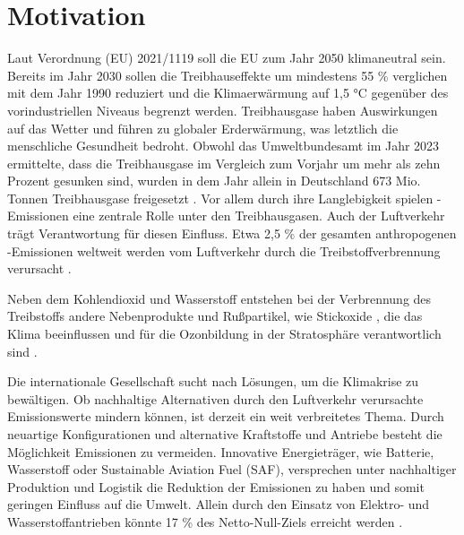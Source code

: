 \chapter{Motivation}
\label{ch:Einleitung}

Laut Verordnung (EU) 2021/1119 soll die EU zum Jahr 2050 klimaneutral sein. Bereits im Jahr 2030 sollen 
die Treibhauseffekte um mindestens 55 \%
verglichen mit dem Jahr 1990 reduziert und die Klimaerwärmung auf 1,5 °C gegenüber 
des vorindustriellen Niveaus begrenzt werden.
Treibhausgase haben Auswirkungen auf das Wetter und führen zu globaler Erderwärmung, 
was letztlich die menschliche Gesundheit bedroht. %
Obwohl das Umweltbundesamt im Jahr 2023 ermittelte, dass die Treibhausgase im Vergleich zum Vorjahr um mehr als zehn Prozent gesunken sind, 
wurden in dem Jahr allein in Deutschland 673 Mio. Tonnen Treibhausgase freigesetzt \cite{bundesregierung}.
Vor allem durch ihre Langlebigkeit \cite{filonchyk2024greenhouse} spielen -Emissionen eine zentrale Rolle unter den Treibhausgasen. 
Auch der Luftverkehr trägt Verantwortung für diesen Einfluss. 
Etwa 2,5 \% der gesamten anthropogenen -Emissionen weltweit werden vom Luftverkehr
durch die Treibstoffverbrennung verursacht \cite{conrady2019luftverkehr}. 

Neben dem Kohlendioxid  und Wasserstoff  entstehen bei der Verbrennung des Treibstoffs andere Nebenprodukte und Rußpartikel, wie Stickoxide ,
die das Klima beeinflussen und für die Ozonbildung in der Stratosphäre verantwortlich sind \cite{conrady2019luftverkehr}.

Die internationale Gesellschaft sucht nach Lösungen, um die Klimakrise zu bewältigen. 
Ob nachhaltige Alternativen durch den Luftverkehr verursachte Emissionswerte mindern können, 
ist derzeit ein weit verbreitetes Thema.
Durch neuartige Konfigurationen und alternative Kraftstoffe und Antriebe besteht die Möglichkeit Emissionen zu vermeiden.
Innovative Energieträger, wie Batterie, Wasserstoff oder Sustainable Aviation Fuel (SAF), 
versprechen unter nachhaltiger Produktion und
Logistik die Reduktion der Emissionen zu haben und somit geringen Einfluss auf die Umwelt.
Allein durch den Einsatz von Elektro- und Wasserstoffantrieben könnte 17 \% des Netto-Null-Ziels erreicht werden \cite{gao2022hydrogen}.
%

